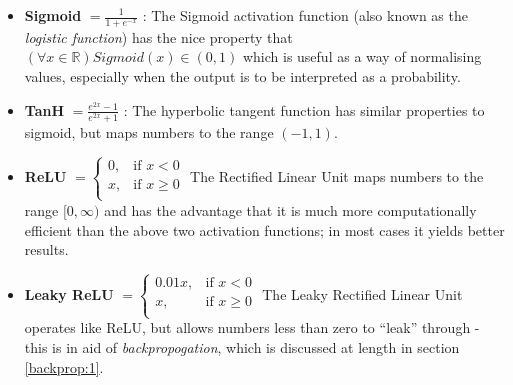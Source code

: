 \documentclass{report}
\begin{document}
\begin{itemize}
 \item\textbf{Sigmoid} $= \frac{1}{1 + e^{-x}}$ : The Sigmoid activation function (also known as the \textit{logistic function}) has the nice property that $(\forall x \in \mathbb{R}) Sigmoid(x)\in(0, 1)$ which is useful as a way of normalising values, especially when the output is to be interpreted as a probability.

 \item\textbf{TanH} $= \frac{e^{2x} - 1}{e^{2x} + 1}$ : The hyperbolic tangent function has similar properties to sigmoid, but maps numbers to the range $(-1, 1)$.

 \item\textbf{ReLU} $= \begin{cases}
 0, & \text{if } x < 0 \\
 x, & \text{if } x \ge 0 \\
 \end{cases}$
 The Rectified Linear Unit maps numbers to the range $[0, \infty)$ and has the advantage that it is much more computationally efficient than the above two activation functions; in most cases it yields better results.
 \item\textbf{Leaky ReLU} $= \begin{cases}
 0.01x, & \text{if } x < 0 \\
 x, & \text{if } x \ge 0 \\
 \end{cases}$
 The Leaky Rectified Linear Unit operates like ReLU, but allows numbers less than zero to ``leak'' through - this is in aid of \textit{backpropogation}, which is discussed at length in section \ref{backprop:1}.
\end{itemize}
\end{document}
